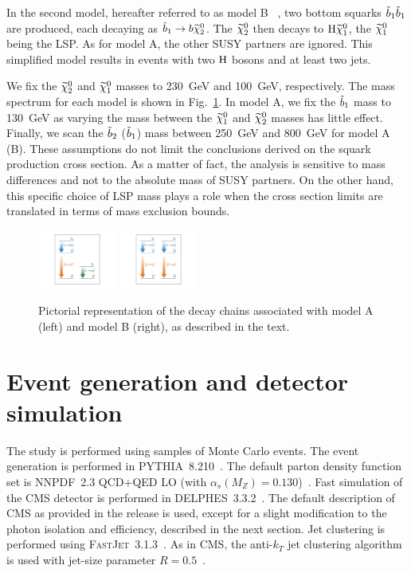 In the second model, hereafter referred to as model B ~\cite{annthesis}, two bottom
squarks $\tilde{b}_1\tilde{b}_1$ are produced, each decaying as
$\tilde{b}_1 \to b \widetilde{\chi}^{0}_2$. The $\widetilde{\chi}^{0}_2$ then decays to $\mathrm{H}
\widetilde{\chi}^{0}_1$, the $\widetilde{\chi}^{0}_1$ being the LSP. As for model A, the other SUSY
partners are ignored. This simplified model results
in events with two $\mathrm{H}$ bosons and at least two jets.

We fix the $\widetilde{\chi}^{0}_2$ and $\widetilde{\chi}^{0}_1$ masses to 230~GeV
and 100~GeV, respectively. 
The mass spectrum for each model is shown in
Fig.~\ref{fig:simplifiedModels}.
In model A, %
we fix the $\tilde{b}_1$ mass to 130~GeV as varying the mass
between the $\widetilde{\chi}^{0}_1$ and $\widetilde{\chi}^{0}_2$ masses has little effect.
Finally, we scan the $\tilde{b}_2$ ($\tilde{b}_1$) mass between 250~GeV
and 800~GeV for model A (B). These assumptions do not limit the
conclusions derived on the squark production cross section. As a
matter of fact, the analysis is sensitive to mass differences and not
to the absolute mass of SUSY partners. On the other hand, this specific
choice of LSP mass plays a role when the cross section limits are
translated in terms of mass exclusion bounds.

\begin{figure}[htb]
\includegraphics[width=0.23\textwidth,viewport=250 100 800 700,clip=true]{figs/pheno/model1}
\includegraphics[width=0.23\textwidth,viewport=250 100 800 700,clip=true]{figs/pheno/model2}
\caption{\label{fig:simplifiedModels} Pictorial representation of the
  decay chains associated with model A (left) and model B (right), as described in the text.}
\end{figure}

\section{Event generation and detector simulation}
\label{sec:gensim}
The study is performed using samples of Monte Carlo events. The event generation is performed in \textsc{PYTHIA}~8.210~\cite{Pythia64,Pythia82}.
The default parton density function set is \textsc{NNPDF}~2.3 QCD+QED
LO (with $\alpha_s(M_Z) =
0.130$)~\cite{NNPDF1,NNPDF2,NNPDF3}. Fast simulation of the CMS
detector is performed in \textsc{DELPHES}~3.3.2~\cite{Delphes3}. The
default description of CMS as provided in the release is used, except
for a slight modification to the photon isolation and efficiency,
described in the next section. Jet clustering is performed using
\textsc{FastJet}~3.1.3~\cite{FastJet}. As in CMS, the anti-$k_T$ jet
clustering algorithm is used with jet-size parameter $R=0.5$~\cite{antikt}.


